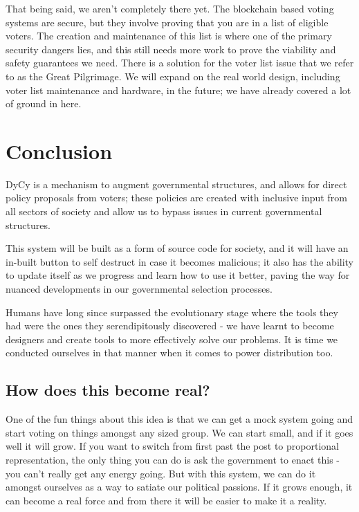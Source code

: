 \documentclass[twoside]{article}
\begin{document}
That being said, we aren’t completely there yet. The blockchain based voting systems are secure, but they involve proving that you are in a list of eligible voters. The creation and maintenance of this list is where one of the primary security dangers lies, and this still needs more work to prove the viability and safety guarantees we need. There is a solution for the voter list issue that we refer to as the Great Pilgrimage. We will expand on the real world design, including voter list maintenance and hardware, in the future; we have already covered a lot of ground in here.

\section{Conclusion}

DyCy is a mechanism to augment governmental structures, and allows for direct policy proposals from voters; these policies are created with inclusive input from all sectors of society and allow us to bypass issues in current governmental structures.

This system will be built as a form of source code for society, and it will have an in-built button to self destruct in case it becomes malicious; it also has the ability to update itself as we progress and learn how to use it better, paving the way for nuanced developments in our governmental selection processes.

Humans have long since surpassed the evolutionary stage where the tools they had were the ones they serendipitously discovered - we have learnt to become designers and create tools to more effectively solve our problems. It is time we conducted ourselves in that manner when it comes to power distribution too.

\subsection{How does this become real?}

One of the fun things about this idea is that we can get a mock system going and start voting on things amongst any sized group. We can start small, and if it goes well it will grow. If you want to switch from first past the post to proportional representation, the only thing you can do is ask the government to enact this - you can’t really get any energy going. But with this system, we can do it amongst ourselves as a way to satiate our political passions. If it grows enough, it can become a real force and from there it will be easier to make it a reality.
\end{document}
